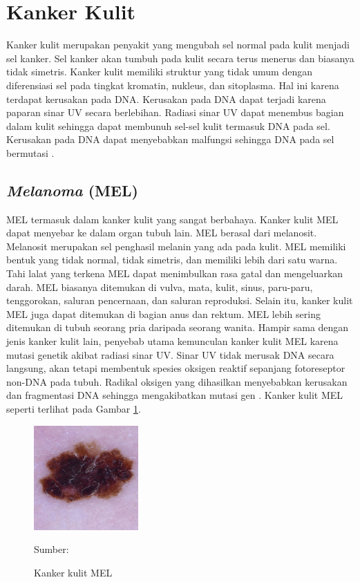 \section{Kanker Kulit}
Kanker kulit merupakan penyakit yang mengubah sel normal pada kulit menjadi sel kanker. Sel kanker akan tumbuh pada kulit secara terus menerus dan biasanya tidak simetris. Kanker kulit memiliki struktur yang tidak umum dengan diferensiasi sel pada tingkat kromatin, nukleus, dan sitoplasma. Hal ini karena terdapat kerusakan pada DNA. Kerusakan pada DNA dapat terjadi karena paparan sinar UV secara berlebihan. Radiasi sinar UV dapat menembus bagian dalam kulit sehingga dapat membunuh sel-sel kulit termasuk DNA pada sel. Kerusakan pada DNA dapat menyebabkan malfungsi sehingga DNA pada sel bermutasi \citep{Nugroho2019}.

    \subsection{\textit{Melanoma} (MEL)}
    MEL termasuk dalam kanker kulit yang sangat berbahaya. Kanker kulit MEL dapat menyebar ke dalam organ tubuh lain. MEL berasal dari melanosit. Melanosit merupakan sel penghasil melanin yang ada pada kulit. MEL memiliki bentuk yang tidak normal, tidak simetris, dan memiliki lebih dari satu warna. Tahi lalat yang terkena MEL dapat menimbulkan rasa gatal dan mengeluarkan darah. MEL biasanya ditemukan di vulva, mata, kulit, sinus, paru-paru, tenggorokan, saluran pencernaan, dan saluran reproduksi. Selain itu, kanker kulit MEL juga dapat ditemukan di bagian anus dan rektum. MEL lebih sering ditemukan di tubuh seorang pria daripada seorang wanita. Hampir sama dengan jenis kanker kulit lain, penyebab utama kemunculan kanker kulit MEL karena mutasi genetik akibat radiasi sinar UV. Sinar UV tidak merusak DNA secara langsung, akan tetapi membentuk spesies oksigen reaktif sepanjang fotoreseptor non-DNA pada tubuh. Radikal oksigen yang dihasilkan menyebabkan kerusakan dan fragmentasi DNA sehingga mengakibatkan mutasi gen \citep{Sang2019}. Kanker kulit MEL seperti terlihat pada Gambar \ref{fig:mel}.
    \begin{figure}[H] 
        \begin{center} 
            \includegraphics[width=4cm]{../img/Skin Cancer MEL - Latex.jpg}
            \caption{Kanker kulit MEL} 
            \label{fig:mel}
            Sumber: \citep{Codella2018,Combalia2019,Tschandl2018}
        \end{center} 
    \end{figure}

